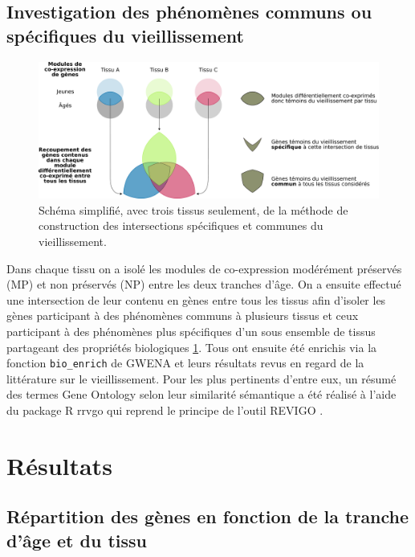 \subsection{Investigation des phénomènes communs ou spécifiques du vieillissement}

\begin{figure}[hb]
    \centering
    \includegraphics[width=1\textwidth]{img/chap2/chap2_intersection_explication.pdf}
    \caption{Schéma simplifié, avec trois tissus seulement, de la méthode de construction des intersections spécifiques et communes du vieillissement.}
    \label{figure:chap2_intersection_explication}
\end{figure}

Dans chaque tissu on a isolé les modules de co-expression modérément préservés (MP) et non préservés (NP) entre les deux tranches d'âge. On a ensuite effectué une intersection de leur contenu en gènes entre tous les tissus afin d'isoler les gènes participant à des phénomènes communs à plusieurs tissus et ceux participant à des phénomènes plus spécifiques d'un sous ensemble de tissus partageant des propriétés biologiques \ref{figure:chap2_intersection_explication}. Tous ont ensuite été enrichis via la fonction \verb+bio_enrich+ de GWENA et leurs résultats revus en regard de la littérature sur le vieillissement. Pour les plus pertinents d'entre eux, un résumé des termes Gene Ontology selon leur similarité sémantique a été réalisé à l'aide du package R rrvgo  qui reprend le principe de l'outil REVIGO .



\section{Résultats}

\subsection{Répartition des gènes en fonction de la tranche d'âge et du tissu}

